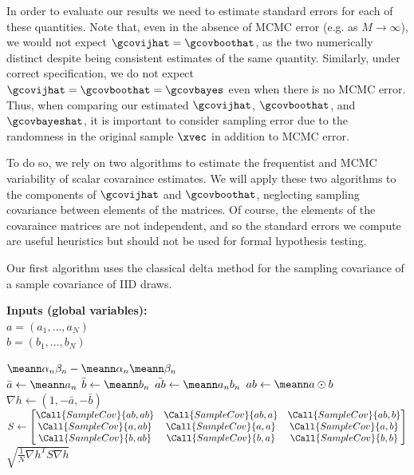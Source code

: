 
In order to evaluate our results we need to estimate standard errors for each of
these quantities.  Note that, even in the absence of MCMC error (e.g. as $M
\rightarrow \infty$), we would not expect $\gcovijhat = \gcovboothat$, as the two
numerically distinct despite being consistent estimates of the same quantity.
Similarly, under correct specification, we do not expect $\gcovijhat = \gcovboothat =
\gcovbayes$ even when there is no MCMC error.  Thus, when comparing our
estimated $\gcovijhat$, $\gcovboothat$, and $\gcovbayeshat$, it is important to
consider sampling error due to the randomness in the original sample $\xvec$ in
addition to MCMC error.

To do so, we rely on two algorithms to estimate the frequentist and MCMC
variability of scalar covaraince estimates.  We will apply these two algorithms
to the components of $\gcovijhat$ and $\gcovboothat$, neglecting sampling
covariance between elements of the matrices.  Of course, the elements of
the covaraince matrices are not independent, and so the standard errors we
compute are useful heuristics but should not be used for formal hypothesis
testing.

Our first algorithm uses the classical delta method for the sampling covariance
of a sample covariance of IID draws.


\begin{algorithm}[H]
\caption{Delta Method for IID Data}
\textbf{Inputs (global variables):}\\
$a = (a_1, \ldots, a_N)$ \\
$b = (b_1, \ldots, b_N)$ \\
%
\begin{algorithmic}
%
\State \Return
    $\meann \alpha_n \beta_n - \meann \alpha_n \meann \beta_n$
\EndFunction\\
%
    \State $\bar{a} \gets \meann a_n$
    \State $\bar{b} \gets \meann b_n$
    \State $\bar{ab} \gets \meann a_n b_n$
    \State $ab \gets \meann a \odot b$
    \State $\nabla h \gets \left(1, -\bar{a}, -\bar{b}\right)$
    \State $S \gets
    \left[
    \begin{matrix}
    \Call{SampleCov}{ab, ab} &
    \Call{SampleCov}{ab, a} &
    \Call{SampleCov}{ab, b} \\
    \Call{SampleCov}{a, ab} &
    \Call{SampleCov}{a, a} &
    \Call{SampleCov}{a, b} \\
    \Call{SampleCov}{b, ab} &
    \Call{SampleCov}{b, a} &
    \Call{SampleCov}{b, b} \\
    \end{matrix}
    \right]$
    \State \Return $\sqrt{\frac{1}{N} \nabla h^T S \nabla h}$
\EndFunction\\
%
\end{algorithmic}
\end{algorithm}

